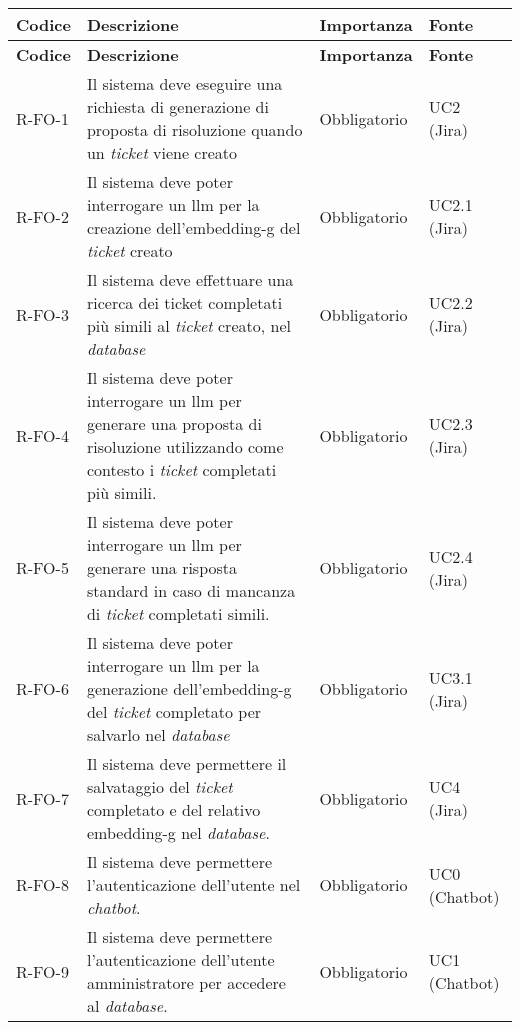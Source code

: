 \renewcommand{\arraystretch}{1.7}
\begin{longtable}{|p{1.5cm}|p{5.5cm}|p{2cm}|p{2.5cm}|} 
    \hline
    \rowcolor{tableheader}\textbf{Codice} & \textbf{Descrizione} & \textbf{Importanza} & \textbf{Fonte}\\
    \hline
    \endfirsthead

    \rowcolor{tableheader}\textbf{Codice} & \textbf{Descrizione} & \textbf{Importanza} & \textbf{Fonte} \\
    \hline
    \endhead

    \hline
    \endfoot

    \hline
    \endlastfoot
    \hline
    R-FO-1 & Il sistema deve eseguire una richiesta di generazione di proposta di risoluzione quando un \textit{ticket} viene creato & Obbligatorio & UC2 (Jira) \\
    \hline
    R-FO-2 & Il sistema deve poter interrogare un \gls{llm} per la creazione dell'\gls{embedding-g} del \textit{ticket} creato & Obbligatorio & UC2.1 (Jira) \\
    \hline
    R-FO-3 & Il sistema deve effettuare una ricerca dei ticket completati più simili al \textit{ticket} creato, nel \textit{database} & Obbligatorio & UC2.2 (Jira) \\
    \hline
    R-FO-4 & Il sistema deve poter interrogare un \gls{llm} per generare una proposta di risoluzione utilizzando come contesto i \textit{ticket} completati più simili. & Obbligatorio & UC2.3 (Jira) \\
    \hline
    R-FO-5 & Il sistema deve poter interrogare un \gls{llm} per generare una risposta standard in caso di mancanza di \textit{ticket} completati simili. & Obbligatorio & UC2.4 (Jira) \\
    \hline
    R-FO-6 & Il sistema deve poter interrogare un \gls{llm} per la generazione dell'\gls{embedding-g} del \textit{ticket} completato per salvarlo nel \textit{database} & Obbligatorio & UC3.1 (Jira) \\
    \hline
    R-FO-7 & Il sistema deve permettere il salvataggio del \textit{ticket} completato e del relativo \gls{embedding-g} nel \textit{database}. & Obbligatorio & UC4 (Jira) \\
    \hline
    R-FO-8 & Il sistema deve permettere l'autenticazione dell'utente nel \textit{chatbot}. & Obbligatorio & UC0 (Chatbot) \\
    \hline
    R-FO-9 & Il sistema deve permettere l'autenticazione dell'utente amministratore per accedere al \textit{database}. & Obbligatorio & UC1 (Chatbot) \\

\end{longtable}
